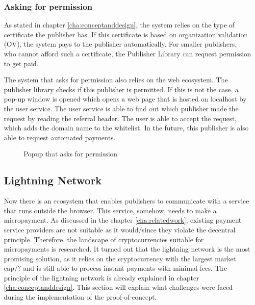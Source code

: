 \subsubsection{Asking for permission}
As stated in chapter \ref{cha:conceptanddesign}, the system relies on the type of certificate the publisher has. If this certificate is based on organization validation (OV), the system pays to the publisher automatically. For smaller publishers, who cannot afford such a certificate, the Publisher Library can request permission to get paid. 

The system that asks for permission also relies on the web ecosystem. The publisher library checks if this publisher is permitted. If this is not the case, a pop-up window is opened which opens a web page that is hosted on localhost by the user service. The user service is able to find out which publisher made the request by reading the referral header. The user is able to accept the request, which adds the domain name to the whitelist. In the future, this publisher is also able to request automated payments.

\begin{figure}[h!]
  \setlength{\fboxsep}{0pt}%
  \caption{Popup that asks for permission}
\end{figure}

\subsection{Lightning Network}
\label{sec:lightningnetwork}

Now there is an ecosystem that enables publishers to communicate with a service that runs outside the browser. This service, somehow, needs to make a micropayment. As discussed in the chapter \ref{cha:relatedwork}, existing payment service providers are not suitable as it would/since they violate the decentral principle. Therefore, the landscape of cryptocurrencies suitable for micropayments is researched. It turned out that the lightning network is the most promising solution, as it relies on the cryptocurrency with the largest market cap/? and is still able to process instant payments with minimal fees. The principle of the lightning network is already explained in chapter \ref{cha:conceptanddesign}. This section will explain what challenges were faced during the implementation of the proof-of-concept.

